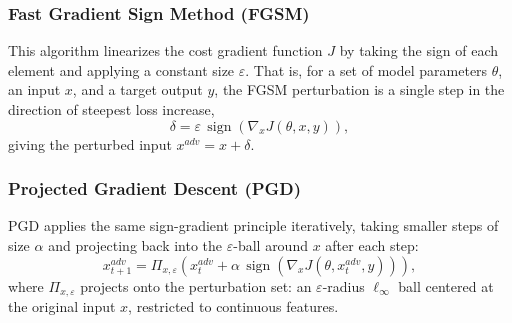 \documentclass[11pt]{article}
\begin{document}
\subsubsection{Fast Gradient Sign Method (FGSM)}

This algorithm linearizes the cost gradient function $J$ by taking the sign of each element and applying a constant size $\varepsilon$. That is, for a set of model parameters $\theta$, an input $x$, and a target output $y$, the FGSM perturbation is a single step in the direction of steepest loss increase,
$$\delta = \varepsilon\,\operatorname{sign}\!\left(\nabla_x J(\theta, x, y)\right),$$
giving the perturbed input $x^{adv} = x + \delta$.

\subsubsection{Projected Gradient Descent (PGD)}

PGD applies the same sign-gradient principle iteratively, taking smaller steps of
size $\alpha$ and projecting back into the $\varepsilon$-ball around $x$ after each step:
$$x^{adv}_{t+1} = \Pi_{x,\varepsilon}\!\left(x^{adv}_t + \alpha\,\operatorname{sign}\!\left(\nabla_x J(\theta, x^{adv}_t, y)\right)\right),$$
where $\Pi_{x,\varepsilon}$ projects onto the perturbation set: an $\varepsilon$-radius
$\ell_\infty$ ball centered at the original input $x$, restricted to continuous features.
\end{document}
